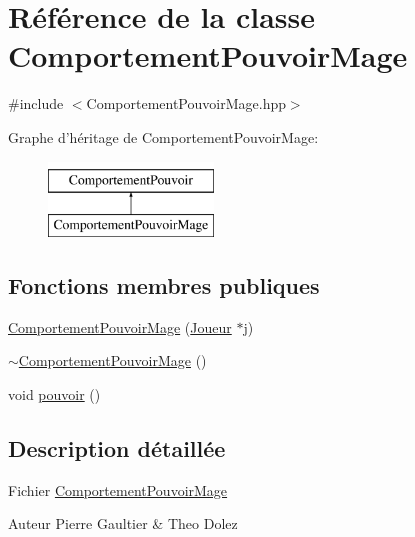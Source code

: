 \hypertarget{class_comportement_pouvoir_mage}{\section{\-Référence de la classe \-Comportement\-Pouvoir\-Mage}
\label{class_comportement_pouvoir_mage}
}


{\ttfamily \#include $<$\-Comportement\-Pouvoir\-Mage.\-hpp$>$}

\-Graphe d'héritage de \-Comportement\-Pouvoir\-Mage\-:\begin{figure}[H]
\begin{center}
\leavevmode
\includegraphics[height=2.000000cm]{class_comportement_pouvoir_mage}
\end{center}
\end{figure}
\subsection*{\-Fonctions membres publiques}
\begin{DoxyCompactItemize}
\item 
\hyperlink{class_comportement_pouvoir_mage_a981ec14dbba67cb5d5c709d84fd23d1d}{\-Comportement\-Pouvoir\-Mage} (\hyperlink{class_joueur}{\-Joueur} $\ast$j)
\item 
\hyperlink{class_comportement_pouvoir_mage_a0eb90adc162f3385ad5962b68a9768b8}{$\sim$\-Comportement\-Pouvoir\-Mage} ()
\item 
void \hyperlink{class_comportement_pouvoir_mage_a8a85b640972603a96f87222306e57e7d}{pouvoir} ()
\end{DoxyCompactItemize}


\subsection{\-Description détaillée}
\-Fichier \hyperlink{class_comportement_pouvoir_mage}{\-Comportement\-Pouvoir\-Mage} \begin{DoxyAuthor}{\-Auteur}
\-Pierre \-Gaultier \& \-Theo \-Dolez 
\end{DoxyAuthor}


